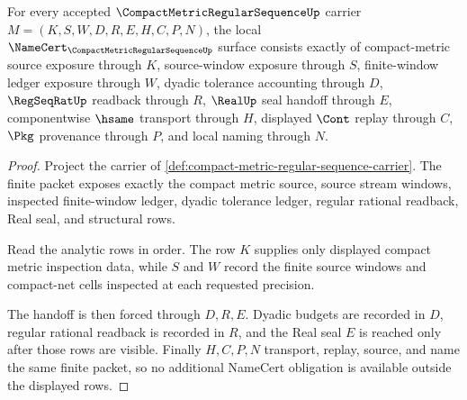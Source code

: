 \begin{theorem}
\label{thm:compact-metric-regular-sequence-namecert-obligations}
For every accepted $\CompactMetricRegularSequenceUp$ carrier $M=(K,S,W,D,R,E,H,C,P,N)$, the local $\NameCert_{\CompactMetricRegularSequenceUp}$ surface consists exactly of compact-metric source exposure through $K$, source-window exposure through $S$, finite-window ledger exposure through $W$, dyadic tolerance accounting through $D$, $\RegSeqRatUp$ readback through $R$, $\RealUp$ seal handoff through $E$, componentwise $\hsame$ transport through $H$, displayed $\Cont$ replay through $C$, $\Pkg$ provenance through $P$, and local naming through $N$.
\end{theorem}
\begin{proof}
Project the carrier of \autoref{def:compact-metric-regular-sequence-carrier}. The finite packet exposes exactly the compact metric source, source stream windows, inspected finite-window ledger, dyadic tolerance ledger, regular rational readback, Real seal, and structural rows.

Read the analytic rows in order. The row $K$ supplies only displayed compact metric inspection data, while $S$ and $W$ record the finite source windows and compact-net cells inspected at each requested precision.

The handoff is then forced through $D,R,E$. Dyadic budgets are recorded in $D$, regular rational readback is recorded in $R$, and the Real seal $E$ is reached only after those rows are visible. Finally $H,C,P,N$ transport, replay, source, and name the same finite packet, so no additional NameCert obligation is available outside the displayed rows.
\end{proof}

